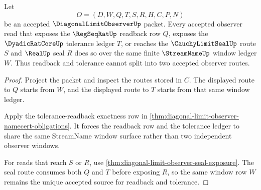 \begin{theorem}
\label{thm:diagonal-limit-observer-tolerance-readback-coherence}
Let
$$
O=(D,W,Q,T,S,R,H,C,P,N)
$$
be an accepted $\DiagonalLimitObserverUp$ packet. Every accepted observer read that exposes the $\RegSeqRatUp$ readback row $Q$, exposes the $\DyadicRatCoreUp$ tolerance ledger $T$, or reaches the $\CauchyLimitSealUp$ route $S$ and $\RealUp$ seal $R$ does so over the same finite $\StreamNameUp$ window ledger $W$. Thus readback and tolerance cannot split into two accepted observer routes.
\end{theorem}
\begin{proof}
Project the packet and inspect the routes stored in $C$. The displayed route to $Q$ starts from $W$, and the displayed route to $T$ starts from that same window ledger.

Apply the tolerance-readback exactness row in \autoref{thm:diagonal-limit-observer-namecert-obligations}. It forces the readback row and the tolerance ledger to share the same StreamName window surface rather than two independent observer windows.

For reads that reach $S$ or $R$, use \autoref{thm:diagonal-limit-observer-seal-exposure}. The seal route consumes both $Q$ and $T$ before exposing $R$, so the same window row $W$ remains the unique accepted source for readback and tolerance.
\end{proof}

